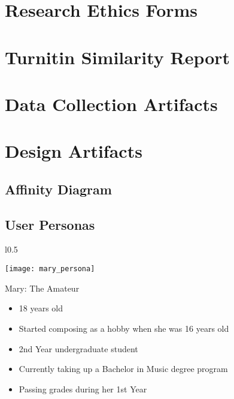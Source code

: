 %
%
%                 

\chapter{Research Ethics Forms}
\label{sec:appendixa}

\chapter{Turnitin Similarity Report}
\label{sec:appendixb}

\chapter{Data Collection Artifacts}
\label{sec:appendixc}

\chapter{Design Artifacts}
\label{sec:appendixd}

\section{Affinity Diagram}

\newpage
\section{User Personas}
\label{sec:user-personas}

\begin{wrapfigure}{l}{0.5\textwidth}

  \begin{center}
    \texttt{[image: mary\_persona]}
  \end{center}
\end{wrapfigure}


Mary: The Amateur \newline

\begin{itemize}
\item 18 years old
\item Started composing as a hobby when she was 16 years old
\item 2nd Year undergraduate student
\item Currently taking up a Bachelor in Music degree program
\item Passing grades during her 1st Year
\end{itemize}

